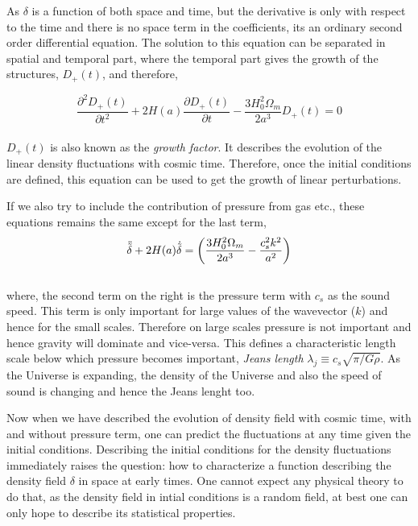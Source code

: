 As $\delta$ is a function of both space
and time, but the derivative is only with respect to the time and there is 
no space term in the coefficients, its an ordinary second order differential equation.
The solution to this equation can be 
separated in spatial and temporal part, where the temporal part gives the 
growth of the structures, $D_+(t)$, and therefore,

\begin{equation}
	\dfrac{\partial^2 D_+(t)}{\partial t^2} + 2 H(a)
		\dfrac{\partial D_+(t)}{\partial t}
		- \dfrac{3H_0^2 \Omega_m}{2a^3} D_+(t) = 0
		\label{eqn:growthfactor}
\end{equation}
\\
$D_+(t)$ is also known as the {\it growth factor}. It describes the evolution of the
linear density fluctuations with cosmic time. Therefore, once the initial conditions
are defined, this equation can be used to get the growth of linear perturbations. 

If we also try to include the contribution of pressure from gas etc., these equations remains
the same except for the last term,
\begin{equation}
\centering
	\ddot{\tilde{\delta}} + 2H(a) \dot{\tilde{\delta}} = 
					\left( \dfrac{3H_0^2\Omega_m}{2a^3} - \dfrac{c_s^2k^2}{a^2}   \right)
\end{equation}
\\
where, the second term on the right is the pressure term with $c_s$ as the sound speed. 
This term is only important
for large values of the wavevector ($k$) and hence for the small scales. Therefore on 
large scales pressure is not important and hence gravity will dominate and vice-versa. 
This defines a characteristic length scale below which pressure becomes important, 
{\it Jeans length} $\lambda_j \equiv c_s \sqrt{\pi/G\rho}$. As the Universe is 
expanding, the density of the Universe and also the speed of sound is changing 
and hence the Jeans lenght too.

Now when we have described the evolution of density field with cosmic time, with and
without pressure term, one can predict the fluctuations at any time given the initial
conditions. Describing the initial conditions for the density fluctuations immediately
raises the question: how to characterize a function describing the density field $\delta$
in space at early times. One cannot expect any physical theory to do that, as the density field
in intial conditions is a random field, at best one can only hope to describe its
statistical properties. 

